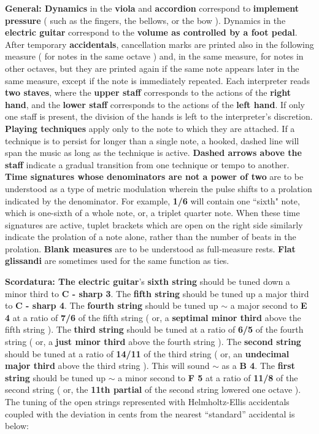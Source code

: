\documentclass[12pt]{article}
\newcommand*\circled[1]{\tikz[baseline=(char.base)]{
            \node[shape=circle,draw,inner sep=1pt] (char) {#1};}}
\begin{document}
\begingroup
\textbf{General: \circled{1} Dynamics} in the \textbf{viola} and \textbf{accordion} correspond to \textbf{implement pressure} ( such as the fingers, the bellows, or the bow ). Dynamics in the \textbf{electric guitar} correspond to the \textbf{volume as controlled by a foot pedal}. \textbf{\circled{2}} After temporary \textbf{accidentals}, cancellation marks are printed also in the following measure ( for notes in the same octave ) and, in the same measure, for notes in other octaves, but they are printed again if the same note appears later in the same measure, except if the note is immediately repeated. \textbf{\circled{3}} Each interpreter reads \textbf{two staves}, where the \textbf{upper staff} corresponds to the actions of the \textbf{right hand}, and the \textbf{lower staff} corresponds to the actions of the \textbf{left hand}. If only one staff is present, the division of the hands is left to the interpreter's discretion. \textbf{\circled{4} Playing techniques} apply only to the note to which they are attached. If a technique is to persist for longer than a single note, a hooked, dashed line will span the music as long as the technique is active. \textbf{\circled{5} Dashed arrows above the staff} indicate a gradual transition from one technique or tempo to another. \textbf{\circled{6} Time signatures whose denominators are not a power of two} are to be understood as a type of metric modulation wherein the pulse shifts to a prolation indicated by the denominator. For example, \textbf{1/6} will contain one ``sixth" note, which is one-sixth of a whole note, or, a triplet quarter note. When these time signatures are active, tuplet brackets which are open on the right side similarly indicate the prolation of a note alone, rather than the number of beats in the prolation. \textbf{\circled{7} Blank measures} are to be understood as full-measure rests. \textbf{\circled{8} Flat glissandi} are sometimes used for the same function as ties.
\endgroup

\pagebreak

\begingroup
\textbf{Scordatura: \circled{1} The electric guitar}'s \textbf{sixth string} should be tuned down a minor third to \textbf{C - sharp 3}. The \textbf{fifth string} should be tuned up a major third to \textbf{C - sharp 4}. The \textbf{fourth string} should be tuned up $\sim$ a major second to \textbf{E 4} at a ratio of \textbf{7/6} of the fifth string ( or, a \textbf{septimal minor third} above the fifth string ). The \textbf{third string} should be tuned at a ratio of \textbf{6/5} of the fourth string ( or, a \textbf{just minor third} above the fourth string ). The \textbf{second string} should be tuned at a ratio of \textbf{14/11} of the third string ( or, an \textbf{undecimal major third} above the third string ). This will sound $\sim$ as a \textbf{B 4}. The \textbf{first string} should be tuned up $\sim$ a minor second to \textbf{F 5} at a ratio of \textbf{11/8} of the second string ( or, the \textbf{11th partial} of the second string lowered one octave ). \\ \textbf{\circled{2}} The tuning of the open strings represented with Helmholtz-Ellis accidentals coupled with the deviation in cents from the nearest “standard” accidental is below:
\end{document}
